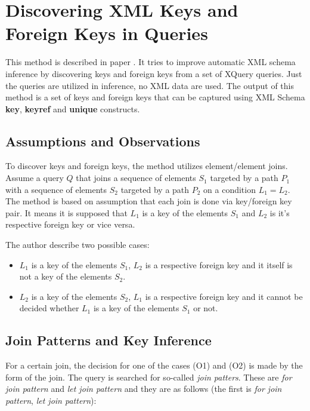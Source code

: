 
\section{Discovering XML Keys and Foreign Keys in Queries}
This method is described in paper \cite{Necasky:2009:DXK:1529282.1529414}. It tries to improve automatic XML schema inference by discovering keys and foreign keys from a set of XQuery queries. Just the queries are utilized in inference, no XML data are used. The output of this method is a set of keys and foreign keys that can be captured using XML Schema \textbf{key}, \textbf{keyref} and \textbf{unique} constructs.

\subsection{Assumptions and Observations}
To discover keys and foreign keys, the method utilizes element/element joins. Assume a query $Q$ that joins a sequence of elements $S_1$ targeted by a path $P_1$ with a sequence of elements $S_2$ targeted by a path $P_2$ on a condition $L_1 = L_2$.
The method is based on assumption that each join is done via key/foreign key pair. It means it is supposed that $L_1$ is a key of the elements $S_1$ and $L_2$ is it's respective foreign key or vice versa.

The author describe two possible cases:

\begin{itemize}
\renewcommand{\theenumi}{(O\arabic{enumi})}
\renewcommand{\labelenumi}{\theenumi}
\item $L_1$ is a key of the elements $S_1$, $L_2$ is a respective foreign key and it itself is not a key of the elements $S_2$.
\item $L_2$ is a key of the elements $S_2$, $L_1$ is a respective foreign key and it cannot be decided whether $L_1$ is a key of the elements $S_1$ or not.
\end{itemize}

\subsection{Join Patterns and Key Inference}
For a certain join, the decision for one of the cases (O1) and (O2) is made by the form of the join. The query is searched for so-called \emph{join patters}. These are \emph{for join pattern} and \emph{let join pattern} and they are as follows (the first is \emph{for join pattern}, \emph{let join pattern}):

